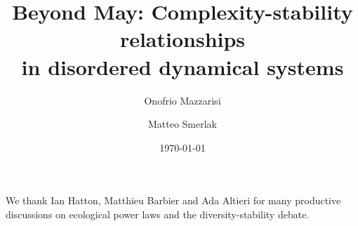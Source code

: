 \documentclass[
 prl,
 twocolumn,
 amsmath,
 amssymb,
 aps,
]{revtex4-2}
\begin{document}
\title{Beyond May: Complexity-stability relationships \\
in disordered dynamical systems}

\author{Onofrio Mazzarisi}

\author{Matteo Smerlak}


\date{\today}

\begin{abstract}

\end{abstract}
\maketitle

\paragraph*{}


\paragraph*{}


\paragraph*{}


\paragraph*{}


\paragraph*{}


\paragraph*{}


\medskip

\begin{acknowledgments}
We thank Ian Hatton, Matthieu Barbier and Ada Altieri for many productive discussions on ecological power laws and the diversity-stability debate. 
\end{acknowledgments}

\medskip



\end{document}

